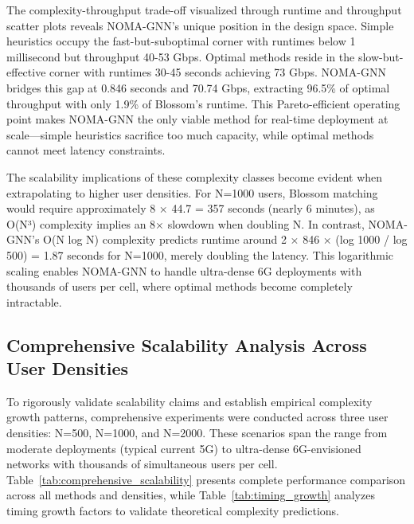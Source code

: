 The complexity-throughput trade-off visualized through runtime and throughput scatter plots reveals NOMA-GNN's unique position in the design space. Simple heuristics occupy the fast-but-suboptimal corner with runtimes below 1 millisecond but throughput 40-53 Gbps. Optimal methods reside in the slow-but-effective corner with runtimes 30-45 seconds achieving 73 Gbps. NOMA-GNN bridges this gap at 0.846 seconds and 70.74 Gbps, extracting 96.5\% of optimal throughput with only 1.9\% of Blossom's runtime. This Pareto-efficient operating point makes NOMA-GNN the only viable method for real-time deployment at scale—simple heuristics sacrifice too much capacity, while optimal methods cannot meet latency constraints.

The scalability implications of these complexity classes become evident when extrapolating to higher user densities. For N=1000 users, Blossom matching would require approximately 8 × 44.7 = 357 seconds (nearly 6 minutes), as O(N³) complexity implies an 8× slowdown when doubling N. In contrast, NOMA-GNN's O(N log N) complexity predicts runtime around 2 × 846 × (log 1000 / log 500) = 1.87 seconds for N=1000, merely doubling the latency. This logarithmic scaling enables NOMA-GNN to handle ultra-dense 6G deployments with thousands of users per cell, where optimal methods become completely intractable.

\subsection{Comprehensive Scalability Analysis Across User Densities}

To rigorously validate scalability claims and establish empirical complexity growth patterns, comprehensive experiments were conducted across three user densities: N=500, N=1000, and N=2000. These scenarios span the range from moderate deployments (typical current 5G) to ultra-dense 6G-envisioned networks with thousands of simultaneous users per cell. Table~\ref{tab:comprehensive_scalability} presents complete performance comparison across all methods and densities, while Table~\ref{tab:timing_growth} analyzes timing growth factors to validate theoretical complexity predictions.

